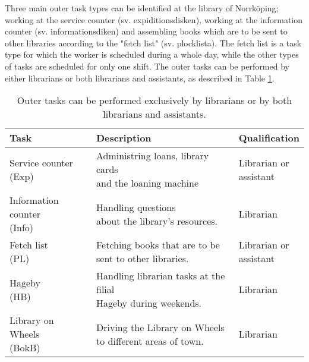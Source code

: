 Three main outer task types can be identified at the library of Norrköping; working at the service counter (sv. expiditionsdisken), working at the information counter (sv. informationsdiken) and assembling books which are to be sent to other libraries according to the "fetch list" (sv. plocklista). The fetch list is a task type for which the worker is scheduled during a whole day, while the other types of tasks are scheduled for only one shift. The outer tasks can be performed by either librarians or both librarians and assistants, as described in Table \ref{tab:Outer_Tasks}.

\begin{table}[h]
\centering
\caption{Outer tasks can be performed exclusively by librarians or by both librarians and assistants.}
\label{tab:Outer_Tasks}
\begin{tabularx}{\textwidth}{|l|l|X|}
\hline
\textbf{Task} & \textbf{Description} & \textbf{Qualification}\\ \hline 
\specialcell[t]{Service counter \\ (Exp)}  & \specialcell[t]{Administring loans, library cards\\ and the loaning machine} & \specialcell[t]{Librarian or \\  assistant} 
\\ \hline
\specialcell[t]{Information counter \\ (Info)} & \specialcell[t]{Handling questions \\about the library's resources.} & Librarian
\\ \hline 
\specialcell[t]{Fetch list \\(PL)} & \specialcell[t]{Fetching books that are to be \\sent to other libraries.} & \specialcell[t]{Librarian  or \\  assistant}
\\ \hline 
\specialcell[t]{Hageby \\(HB)} & \specialcell[t]{Handling librarian tasks at the filial \\ Hageby during weekends.} & Librarian
\\ \hline 
\specialcell[t]{Library on Wheels \\(BokB)} & \specialcell[t]{Driving the Library on Wheels \\ to different areas of town.} & Librarian
\\ \hline 
\end{tabularx}
\end{table} 

